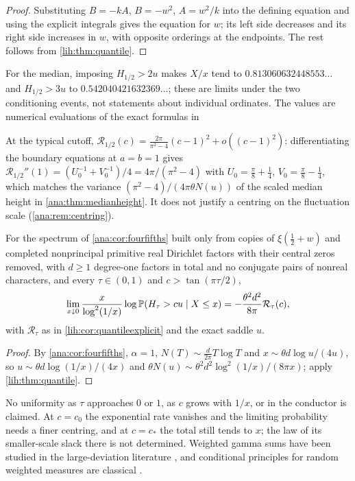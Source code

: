 \begin{proof}
Substituting $B=-kA$, $B=-w^2$, $A=w^2/k$ into the defining equation and using the explicit integrals gives
the equation for $w$; its left side decreases and its right side increases in $w$, with opposite
orderings at the endpoints. The rest follows from \cref{lih:thm:quantile}.
\end{proof}

For the median, imposing $H_{1/2}>2u$ makes $X/x$ tend to $0.813060632448553\ldots$ and $H_{1/2}>3u$ to
$0.542040421632369\ldots$; these are limits under the two conditioning events, not statements about
individual ordinates. The values are numerical evaluations of the exact formulas in
\begin{center}\footnotesize
{}
\end{center}
At the typical cutoff, $\mathcal R_{1/2}(c)=\frac{2\pi}{\pi^2-4}(c-1)^2+o((c-1)^2)$: differentiating the boundary equations
at $a=b=1$ gives $\mathcal R_{1/2}''(1)=(U_0^{-1}+V_0^{-1})/4=4\pi/(\pi^2-4)$ with $U_0=\frac\pi8+\frac14$, $V_0=\frac\pi8-\frac14$, which matches the
variance $(\pi^2-4)/(4\pi\theta N(u))$ of the scaled median height in \cref{ana:thm:medianheight}. It does not
justify a centring on the fluctuation scale (\cref{ana:rem:centring}).

\begin{corollary}\label{lih:cor:quantilearith}
For the spectrum of \cref{ana:cor:fourfifths} built only from copies of $\xi(\frac12+w)$ and completed
nonprincipal primitive real Dirichlet factors with their central zeros removed, with $d\ge1$ degree-one
factors in total and no conjugate pairs of nonreal characters, and every $\tau\in(0,1)$ and
$c>\tan(\pi\tau/2)$,
\[
 \lim_{x\downarrow0}\frac x{\log^2(1/x)}\log\mathbb{P}(H_\tau>cu\mid X\le x)=-\frac{\theta^2d^2}{8\pi}\mathcal R_\tau(c),
\]
with $\mathcal R_\tau$ as in \cref{lih:cor:quantileexplicit} and the exact saddle $u$.
\end{corollary}

\begin{proof}
By \cref{ana:cor:fourfifths}, $\alpha=1$, $N(T)\sim\frac d{2\pi}T\log T$ and $x\sim\theta d\log u/(4u)$, so $u\sim\theta d\log(1/x)/(4x)$ and
$\theta N(u)\sim\theta^2d^2\log^2(1/x)/(8\pi x)$; apply \cref{lih:thm:quantile}.
\end{proof}

No uniformity as $\tau$ approaches $0$ or $1$, as $c$ grows with $1/x$, or in the conductor is claimed. At
$c=c_0$ the exponential rate vanishes and the limiting probability needs a finer centring, and at $c=c_*$
the total still tends to $x$; the law of its smaller-scale slack there is not determined. Weighted
gamma sums have been studied in the large-deviation literature \cite{Saulis2002Large}, and conditional
principles for random weighted measures are classical \cite{VanCampenhoutCover1981Maximum,Gozlan2005Conditional}.

